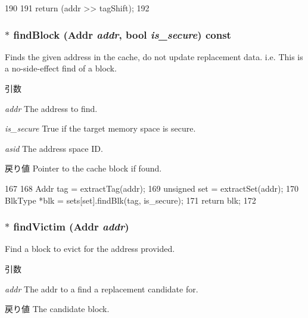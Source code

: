 \begin{DoxyCode}
190     {
191         return (addr >> tagShift);
192     }
\end{DoxyCode}
\hypertarget{classLRU_a0db6e9d80746c5480efcbba5d6be30da}{
\subsubsection[{findBlock}]{ $\ast$ findBlock ({\bf Addr} {\em addr}, \/  bool {\em is\_\-secure}) const}}
\label{classLRU_a0db6e9d80746c5480efcbba5d6be30da}
Finds the given address in the cache, do not update replacement data. i.e. This is a no-\/side-\/effect find of a block. 
\begin{DoxyParams}{引数}
\item[{\em addr}]The address to find. \item[{\em is\_\-secure}]True if the target memory space is secure. \item[{\em asid}]The address space ID. \end{DoxyParams}
\begin{DoxyReturn}{戻り値}
Pointer to the cache block if found. 
\end{DoxyReturn}



\begin{DoxyCode}
167 {
168     Addr tag = extractTag(addr);
169     unsigned set = extractSet(addr);
170     BlkType *blk = sets[set].findBlk(tag, is_secure);
171     return blk;
172 }
\end{DoxyCode}
\hypertarget{classLRU_ac69a78bca11156aff8773ad59125b55b}{
\subsubsection[{findVictim}]{ $\ast$ findVictim ({\bf Addr} {\em addr})}}
\label{classLRU_ac69a78bca11156aff8773ad59125b55b}
Find a block to evict for the address provided. 
\begin{DoxyParams}{引数}
\item[{\em addr}]The addr to a find a replacement candidate for. \end{DoxyParams}
\begin{DoxyReturn}{戻り値}
The candidate block. 
\end{DoxyReturn}



